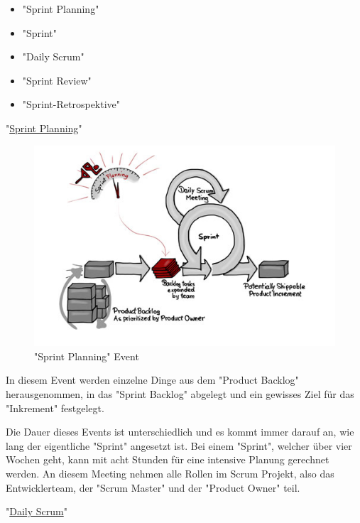 \begin{itemize}
    \item "Sprint Planning"
    \item "Sprint"
    \item "Daily Scrum"
    \item "Sprint Review"
    \item "Sprint-Retrospektive"
\end{itemize}

\cite{Scrum}

\pagebreak

"\underline{Sprint Planning}"

\begin{figure}[H]
    \centering
    \includegraphics[width=\textwidth]{media/ProjectManagement/SprintPlanning.jpg}
    \caption{"Sprint Planning" Event \cite{PlanningBild}}
\end{figure}

In diesem Event werden einzelne Dinge aus dem "Product Backlog" herausgenommen, in das "Sprint Backlog" abgelegt und ein gewisses Ziel für das "Inkrement" festgelegt. \cite{Planning}

Die Dauer dieses Events ist unterschiedlich und es kommt immer darauf an, wie lang der eigentliche "Sprint" angesetzt ist. Bei einem "Sprint", welcher über vier Wochen geht, kann mit acht Stunden für eine intensive Planung gerechnet werden. An diesem Meeting nehmen alle Rollen im Scrum Projekt, also das Entwicklerteam, der "Scrum Master" und der "Product Owner" teil. \cite{Planning}

\pagebreak

"\underline{Daily Scrum}"

